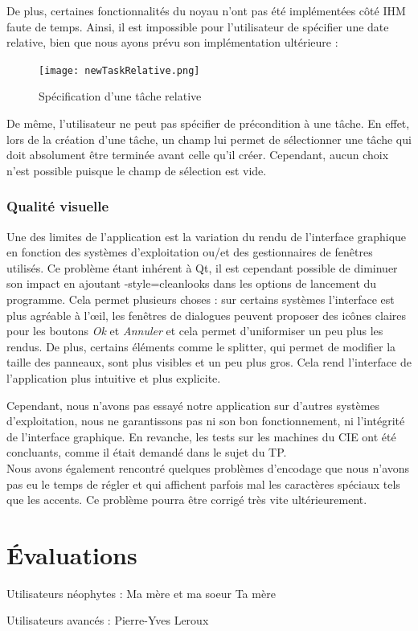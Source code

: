 			De plus, certaines fonctionnalités du noyau n'ont pas été implémentées côté IHM faute de temps. Ainsi, il est impossible pour l'utilisateur de spécifier une date relative, bien que nous ayons prévu son implémentation ultérieure :
			\begin{figure}[h!]
				\centering
			   \texttt{[image: newTaskRelative.png]}
			   \caption{Spécification d'une tâche relative}
			\end{figure}
			\FloatBarrier
		
			De même, l'utilisateur ne peut pas spécifier de précondition à une tâche. En effet, lors de la création d'une tâche, un champ lui permet de sélectionner une tâche qui doit absolument être terminée avant celle qu'il créer. Cependant, aucun choix n'est possible puisque le champ de sélection est vide.
			
		
		\subsection{Qualité visuelle}
			Une des limites de l'application est la variation du rendu de l'interface graphique en fonction des systèmes d'exploitation ou/et des gestionnaires de fenêtres utilisés. Ce problème étant inhérent à Qt, il est cependant possible de diminuer son impact en ajoutant \og -style=cleanlooks \fg dans les options de lancement du programme. Cela permet plusieurs choses : sur certains systèmes l'interface est plus agréable à l'{\oe}il, les fenêtres de dialogues peuvent proposer des icônes claires pour les boutons \emph{Ok} et \emph{Annuler} et cela permet d'uniformiser un peu plus les rendus. De plus, certains éléments comme le splitter, qui permet de modifier la taille des panneaux, sont plus visibles et un peu plus gros. Cela rend l'interface de l'application plus intuitive et plus explicite.
	
			Cependant, nous n'avons pas essayé notre application sur d'autres systèmes d'exploitation, nous ne garantissons pas ni son bon fonctionnement, ni l'intégrité de l'interface graphique. En revanche, les tests sur les machines du CIE ont été concluants, comme il était demandé dans le sujet du TP.\\
			
			Nous avons également rencontré quelques problèmes d'encodage que nous n'avons pas eu le temps de régler et qui affichent parfois mal les caractères spéciaux tels que les accents. Ce problème pourra être corrigé très vite ultérieurement.


\chapter{Évaluations}
	
	Utilisateurs néophytes :
		Ma mère et ma soeur
		Ta mère
		
	Utilisateurs avancés :
		Pierre-Yves
		Leroux

